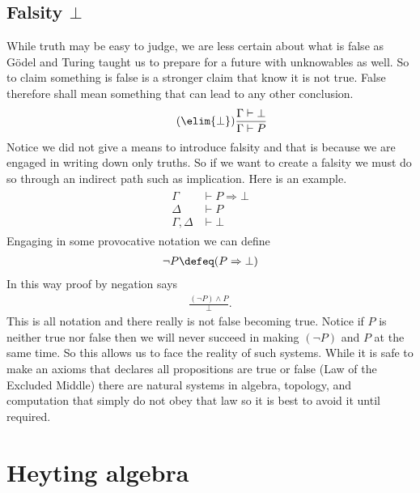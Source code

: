 \subsection{Falsity $\bot$}
While truth may be easy to judge, we are less certain about what is false as 
G\"odel and Turing taught us to prepare for a future with unknowables as well.
So to claim something is false is a stronger claim that know it is not true.
False therefore shall mean something that can lead to any other conclusion.
\begin{align}
    \tag{$\elim{\bot}$}
    \frac{\Gamma\vdash \bot}{\Gamma\vdash P}
\end{align}
Notice we did not give a means to introduce falsity and that is because we 
are engaged in writing down only truths.  So if we want to create a falsity 
we must do so through an indirect path such as implication.  Here is an example.
\begin{align}
    \tag{Proof by negation}
    \begin{array}{rl}
    \Gamma & \vdash P\Rightarrow \bot \\
    \Delta & \vdash P \\
    \hline 
    \Gamma,\Delta & \vdash \bot
    \end{array}
\end{align}
Engaging in some provocative notation we can define 
\begin{align*}
    \neg P \defeq (P\Rightarrow \bot)
\end{align*}
In this way proof by negation says 
\begin{align*}
    \frac{(\neg P)\wedge P}{\bot}.
\end{align*}
This is all notation and there really is not false becoming true.  Notice 
if $P$ is neither true nor false then we will never succeed in making 
$(\neg P)$ and $P$ at the same time.  So this allows us to face the reality 
of such systems.  While it is safe to make an axioms that declares all 
propositions are true or false (Law of the Excluded Middle) there are natural 
systems in algebra, topology, and computation that simply do not obey that law 
so it is best to avoid it until required.

\section{Heyting algebra}
